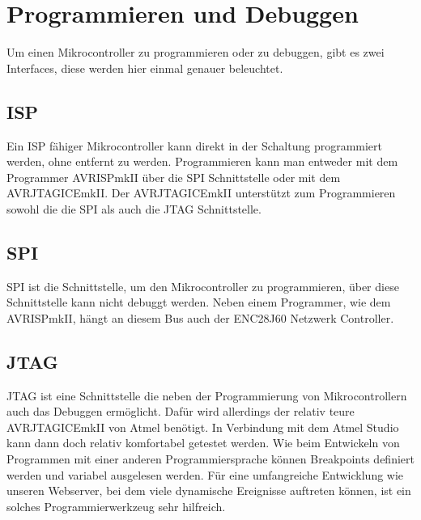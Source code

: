 \chapter{Programmieren und Debuggen}

Um einen Mikrocontroller zu programmieren oder zu debuggen, gibt es zwei
Interfaces, diese werden hier einmal genauer beleuchtet.

\section{ISP}

Ein \ac{ISP} fähiger Mikrocontroller kann direkt in der Schaltung programmiert
werden, ohne entfernt zu werden. Programmieren kann man entweder mit dem
Programmer AVRISPmkII über die \acs{SPI} Schnittstelle oder mit dem  
AVRJTAGICEmkII. Der AVRJTAGICEmkII unterstützt zum Programmieren sowohl die
die \acs{SPI} als auch die \acs{JTAG} Schnittstelle.

\section{SPI}

\acf{SPI} ist die Schnittstelle, um den Mikrocontroller zu programmieren, über
diese Schnittstelle kann nicht debuggt werden. Neben einem Programmer, wie dem
AVRISPmkII, hängt an diesem Bus auch der ENC28J60 Netzwerk Controller.

\section{JTAG}

\acf{JTAG} ist eine Schnittstelle die neben der Programmierung von
Mikrocontrollern auch das Debuggen ermöglicht.
Dafür wird allerdings der relativ teure AVRJTAGICEmkII von Atmel benötigt.
In Verbindung mit dem Atmel Studio kann dann doch relativ komfortabel getestet
werden. Wie beim Entwickeln von Programmen mit einer anderen Programmiersprache
können Breakpoints definiert werden und variabel ausgelesen werden. Für eine
umfangreiche Entwicklung wie unseren Webserver, bei dem viele dynamische
Ereignisse auftreten können, ist ein solches Programmierwerkzeug sehr hilfreich.
